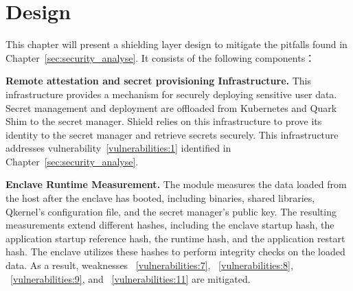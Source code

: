 \chapter{Design}
\label{sec:design}





This chapter will present a shielding layer design to mitigate the pitfalls found in Chapter~\ref{sec:security_analyse}. It consists of the following components：

\textbf{Remote attestation and secret provisioning Infrastructure.} This infrastructure provides a mechanism for securely deploying sensitive user data. Secret management and deployment are offloaded from Kubernetes and Quark Shim to the secret manager. Shield relies on this infrastructure to prove its identity to the secret manager and retrieve secrets securely. This infrastructure addresses vulnerability~\ref{vulnerabilities:1} identified in Chapter~\ref{sec:security_analyse}.

\textbf{Enclave Runtime Measurement.} The module measures the data loaded from the host after the enclave has booted, including binaries, shared libraries, Qkernel's configuration file, and the secret manager's public key. The resulting measurements extend different hashes, including the enclave startup hash, the application startup reference hash, the runtime 
hash, and the application restart hash. The enclave utilizes these hashes to perform integrity checks on the loaded data. As a result, weaknesses ~\ref{vulnerabilities:7}, ~\ref{vulnerabilities:8}, ~\ref{vulnerabilities:9}, and ~\ref{vulnerabilities:11} are mitigated.
 
